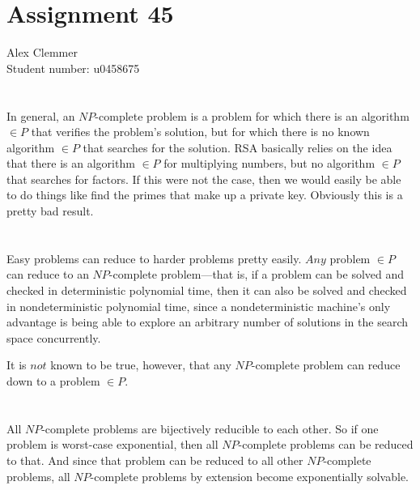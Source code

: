 \documentclass[a4paper]{article}
\begin{document}
\section*{Assignment 45}
Alex Clemmer\\
Student number: u0458675

\section{}

In general, an $NP$-complete problem is a problem for which there is an algorithm $\in P$ that verifies the problem's solution, but for which there is no known algorithm $\in P$ that searches for the solution. RSA basically relies on the idea that there is an algorithm $\in P$ for multiplying numbers, but no algorithm $\in P$ that searches for factors. If this were not the case, then we would easily be able to do things like find the primes that make up a private key. Obviously this is a pretty bad result.

\section{}

Easy problems can reduce to harder problems pretty easily. $\textit{Any}$ problem $\in P$ can reduce to an $NP$-complete problem---that is, if a problem can be solved and checked in deterministic polynomial time, then it can also be solved and checked in nondeterministic polynomial time, since a nondeterministic machine's only advantage is being able to explore an arbitrary number of solutions in the search space concurrently.

It is $\textit{not}$ known to be true, however, that any $NP$-complete problem can reduce down to a problem $\in P$.

\section{}

All $NP$-complete problems are bijectively reducible to each other. So if one problem is worst-case exponential, then all $NP$-complete problems can be reduced to that. And since that problem can be reduced to all other $NP$-complete problems, all $NP$-complete problems by extension become exponentially solvable.

\section{}
\end{document}
